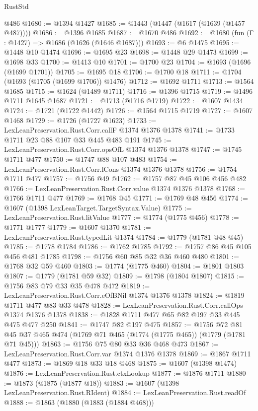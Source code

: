 \begin{lexlean}{RustStd}
\begin{coremodule}
{\begin{coremodule}
{{{{{{{{{{{    @486
@1680 := @1394 @1427
@1685 := @1443 (@1447 (@1617 (@1639 (@1457 @487))))
@1686 := @1396 @1685
@1687 := @1670 @486
@1692 := @1680 (fun (Γ : @1427) => @1686 (@1626 (@1646 @1687)))
@1693 := @6 @1475
@1695 := @1448 @10 @1474
@1696 := @1695 @23
@1698 := @1448 @29 @1473
@1699 := @1698 @33
@1700 := @1413 @10
@1701 := @1700 @23
@1704 := @1693 (@1696 (@1699 @1701))
@1705 := @1695 @18
@1706 := @1700 @18
@1711 := @1704 (@1693 (@1705 (@1699 @1706)) @1476)
@1712 := @1692 @1711
@1713 := @1564 @1685
@1715 := @1624 (@1489 @1711)
@1716 := @1396 @1715
@1719 := @1496 @1711 @1645 @1687
@1721 := @1713 (@1716 @1719)
@1722 := @1607 @1434
@1724 := @1721 (@1722 @1442)
@1726 := @1564 @1715 @1719
@1727 := @1607 @1468
@1729 := @1726 (@1727 @1623)
@1733 := LexLeanPreservation.Rust.Corr.callF @1374 @1376 @1378
@1741 := @1733 @1711 @23 @88 @107 @33 @445 @483 @191
@1745 := LexLeanPreservation.Rust.Corr.opsOfL @1374 @1376 @1378
@1747 := @1745 @1711 @477
@1750 := @1747 @88 @107 @483
@1754 := LexLeanPreservation.Rust.Corr.lCons @1374 @1376 @1378
@1756 := @1754 @1711 @477
@1757 := @1756 @49
@1762 := @1757 @87 @45 @106 @456 @482
@1766 := LexLeanPreservation.Rust.Corr.value @1374 @1376 @1378
@1768 := @1766 @1711 @477
@1769 := @1768 @45
@1771 := @1769 @48 @456
@1774 := @1607 (@1398 LexLeanTarget.TargetSyntax.Value)
@1775 := LexLeanPreservation.Rust.litValue
@1777 := @1774 (@1775 @456)
@1778 := @1771 @1777
@1779 := @1607 @1370
@1781 := LexLeanPreservation.Rust.typedLit @1374
@1784 := @1779 (@1781 @48 @45)
@1785 := @1778 @1784
@1786 := @1762 @1785
@1792 := @1757 @86 @45 @105 @456 @481 @1785
@1798 := @1756 @60 @85 @32 @36 @460 @480
@1801 := @1768 @32 @59 @460
@1803 := @1774 (@1775 @460)
@1804 := @1801 @1803
@1807 := @1779 (@1781 @59 @32)
@1809 := @1798 (@1804 @1807)
@1815 := @1756 @83 @79 @33 @35 @478 @472
@1819 := LexLeanPreservation.Rust.Corr.eOfBNil @1374 @1376 @1378
@1824 := @1819 @1711 @477 @83 @33 @478
@1828 := LexLeanPreservation.Rust.Corr.callOps @1374 @1376 @1378
@1838 := @1828 @1711 @477 @65 @82 @197 @33 @445 @475 @477 @250
@1841 := @1747 @82 @197 @475
@1857 := @1756
    @72
    @81
    @45
    @37
    @465
    @474
    (@1769 @71 @465 (@1774 (@1775 @465)) (@1779 (@1781 @71 @45)))
@1863 := @1756 @75 @80 @33 @36 @468 @473
@1867 := LexLeanPreservation.Rust.Corr.var @1374 @1376 @1378
@1869 := @1867 @1711 @477
@1873 := @1869 @18 @33 @18 @468
@1875 := @1607 (@1398 @1474)
@1876 := LexLeanPreservation.Rust.ctxLookup
@1877 := @1876 @1711
@1880 := @1873 (@1875 (@1877 @18))
@1883 := @1607 (@1398 LexLeanPreservation.Rust.RIdent)
@1884 := LexLeanPreservation.Rust.readOf
@1888 := @1863 (@1880 (@1883 (@1884 @468)))
}}}}}}}}}}}
\end{coremodule}}
\end{coremodule}
\end{lexlean}
